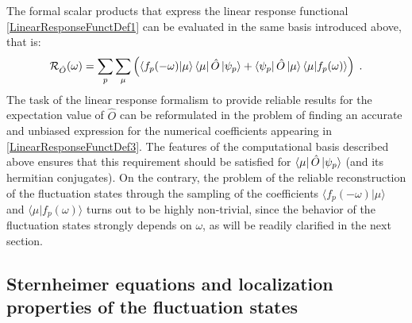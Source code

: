 \documentclass[a4paper]{article}
\newcommand{\be}{\begin{equation}}
\newcommand{\ee}{\end{equation}}
\newcommand{\lb}{\label}
\newcommand{\op}[1]{\hat {#1}}
\newcommand{\brket}[2]{\langle  #1 | #2 \rangle} %
\begin{document}
The formal scalar products that express the linear response functional \eqref{LinearResponseFunctDef1} can be evaluated in the same basis introduced above, that is: 
\be\lb{LinearResponseFunctDef3}
{\cal R}_{\op O}(\omega) = 
\sum_p\sum_\mu\left(\brket{f_p(-\omega)}{\mu}\bra{\mu}\op O\ket{\psi_p} + \bra{\psi_p}\op O\ket{\mu}\brket{\mu}{f_p(\omega)}\right) \;.
\ee
The task of the linear response formalism to provide reliable results for the expectation value of $\op O$ can be reformulated in the problem of finding an accurate and unbiased
expression for the numerical coefficients appearing in \eqref{LinearResponseFunctDef3}. The features of the computational basis described above ensures that this requirement should
be satisfied for $\bra{\mu}\op O\ket{\psi_p}$ (and its hermitian conjugates). 
On the contrary, the problem of the reliable reconstruction of the fluctuation states through the sampling of the coefficients $\brket{f_p(-\omega)}{\mu}$ and $\brket{\mu}{f_p(\omega)}$
turns out to be highly non-trivial, since the behavior of the fluctuation states strongly depends on $\omega$, as will be readily clarified in the next section.

\subsection{Sternheimer equations and localization properties of the fluctuation states}
\lb{LocalizationFluctuationStates}
\end{document}
